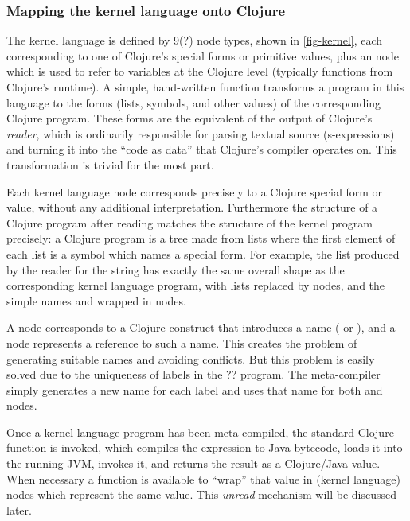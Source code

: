 \subsubsection{Mapping the kernel language onto Clojure}
The kernel language is defined by 9(?) node types, shown in \ref{fig-kernel}, each corresponding to one of Clojure's special forms or primitive values, plus an  node which is used to refer to variables at the Clojure level (typically functions from Clojure's runtime). A simple, hand-written function  transforms a program in this language to the forms (lists, symbols, and other values) of the corresponding Clojure program. These forms are the equivalent of the output of Clojure's \emph{reader}, which is ordinarily responsible for parsing textual source (s-expressions) and turning it into the ``code as data'' that Clojure's compiler operates on. This transformation is trivial for the most part.

Each kernel language node corresponds precisely to a Clojure special form or value, without any additional interpretation. Furthermore the structure of a Clojure program after reading matches the structure of the kernel program precisely: a Clojure program is a tree made from lists where the first element of each list is a symbol which names a special form. For example, the list produced by the reader for the string  has exactly the same overall shape as the corresponding kernel language program, with lists replaced by  nodes, and the simple names \clojure{*} and \clojure{+} wrapped in  nodes. 

A  node corresponds to a Clojure construct that introduces a name ( or ), and a  node represents a reference to such a name. This creates the problem of generating suitable names and avoiding conflicts. But this problem is easily solved due to the uniqueness of labels in the ?? program. The meta-compiler simply generates a new name for each label and uses that name for both  and  nodes.

Once a kernel language program has been meta-compiled, the standard Clojure function  is invoked, which compiles the expression to Java bytecode, loads it into the running JVM, invokes it, and returns the result as a Clojure/Java value. When necessary a function is available to ``wrap'' that value in (kernel language) nodes which represent the same value. This \emph{unread} mechanism will be discussed later. 


